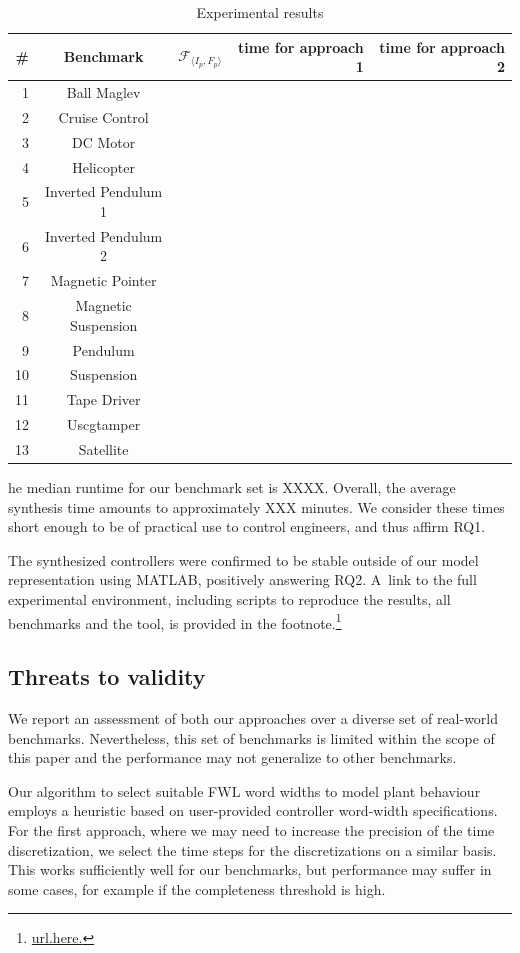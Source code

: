 \documentclass[runningheads,a4paper]{llncs}
\begin{document}
\begin{table}

\begin{tabular}{| r | c | l | r | r |}
\hline
\# & Benchmark  & $\mathcal{F}_{\langle I_p,F_p \rangle}$ & time for approach 1  & time for approach 2 \\\hline
1 & Ball Maglev & & & \\
2 & Cruise Control & & & \\
3 & DC Motor& & & \\
4 & Helicopter & & & \\
5 & Inverted Pendulum 1& & & \\
6 & Inverted Pendulum 2& & & \\
7 & Magnetic Pointer& & & \\
8 & Magnetic Suspension& & & \\
9 & Pendulum& & & \\
10 & Suspension& & & \\
11 & Tape Driver & & & \\
12 & Uscgtamper & & & \\
13 & Satellite & & & \\\hline

\end{tabular}
\caption{Experimental results \label{tab:results}}
\end{table}

he median runtime for our benchmark set is XXXX.  Overall,
the average synthesis time amounts to approximately XXX minutes.  We
consider these times short enough to be of practical use to control
engineers, and thus affirm RQ1.  

The
synthesized controllers were confirmed to be stable outside of our model
representation using MATLAB, positively answering RQ2.  A~link to the full
experimental environment, including scripts to reproduce the results, all
benchmarks and the tool, is provided in the
footnote.\footnote{\url{url.here.}}


\subsection{Threats to validity}
We report an assessment of both our approaches over a diverse set of real-world benchmarks. Nevertheless, this set of benchmarks is limited within the scope of this paper and the performance may not generalize to other benchmarks. 

Our algorithm to select suitable FWL word widths to model plant behaviour employs a heuristic based on user-provided controller word-width specifications. For the first approach, where we may need to increase the precision of the time discretization, we select the time steps for the discretizations on a similar basis. This works sufficiently well for our benchmarks, but performance may suffer in some cases, for example if the completeness threshold is high. 
\end{document}
